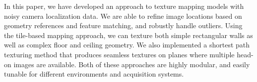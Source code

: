 \documentclass[]{spie}  %
\begin{document}
{In this paper, we have developed an approach to texture mapping models
with noisy camera localization data. We are able to refine image
locations based on geometry references and feature matching, and
robustly handle outliers. Using the tile-based mapping approach, we
can texture both simple rectangular walls as well as complex floor and
ceiling geometry. We also implemented a shortest path texturing method
that produces seamless textures on planes where multiple head-on
images are available. Both of these approaches are highly modular, and
easily tunable for different environments and acquisition systems.

\begin{figure}
  \centering
   ~~~~~~~~
  \centering

  \centering {}


\end{figure}}
\end{document}
